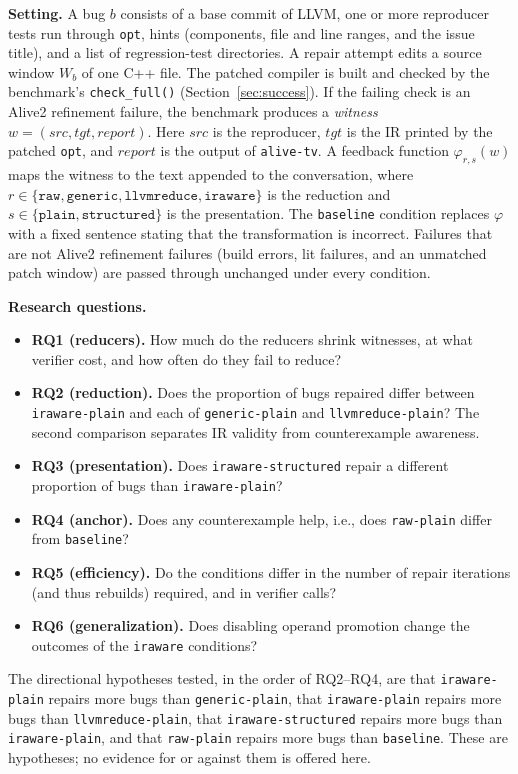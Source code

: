 \documentclass[conference]{IEEEtran}
\newcommand{\cn}[1]{\texttt{#1}}   %
\begin{document}
\textbf{Setting.} A bug $b$ consists of a base commit of LLVM, one or more reproducer tests run through \texttt{opt}, hints (components, file and line ranges, and the issue title), and a list of regression-test directories. A repair attempt edits a source window $W_b$ of one C++ file. The patched compiler is built and checked by the benchmark's \texttt{check\_full()} (Section~\ref{sec:success}). If the failing check is an Alive2 refinement failure, the benchmark produces a \emph{witness} $w=(\mathit{src},\mathit{tgt},\mathit{report})$. Here $\mathit{src}$ is the reproducer, $\mathit{tgt}$ is the IR printed by the patched \texttt{opt}, and $\mathit{report}$ is the output of \texttt{alive-tv}. A feedback function $\varphi_{r,s}(w)$ maps the witness to the text appended to the conversation, where $r\in\{\texttt{raw},\texttt{generic},\texttt{llvmreduce},\texttt{iraware}\}$ is the reduction and $s\in\{\texttt{plain},\texttt{structured}\}$ is the presentation. The \cn{baseline} condition replaces $\varphi$ with a fixed sentence stating that the transformation is incorrect. Failures that are not Alive2 refinement failures (build errors, lit failures, and an unmatched patch window) are passed through unchanged under every condition.

\textbf{Research questions.}
\begin{itemize}
\item \textbf{RQ1 (reducers).} How much do the reducers shrink witnesses, at what verifier cost, and how often do they fail to reduce?
\item \textbf{RQ2 (reduction).} Does the proportion of bugs repaired differ between \cn{iraware-plain} and each of \cn{generic-plain} and \cn{llvmreduce-plain}? The second comparison separates IR validity from counterexample awareness.
\item \textbf{RQ3 (presentation).} Does \cn{iraware-structured} repair a different proportion of bugs than \cn{iraware-plain}?
\item \textbf{RQ4 (anchor).} Does any counterexample help, i.e., does \cn{raw-plain} differ from \cn{baseline}?
\item \textbf{RQ5 (efficiency).} Do the conditions differ in the number of repair iterations (and thus rebuilds) required, and in verifier calls?
\item \textbf{RQ6 (generalization).} Does disabling operand promotion change the outcomes of the \cn{iraware} conditions?
\end{itemize}
The directional hypotheses tested, in the order of RQ2--RQ4, are that \cn{iraware-plain} repairs more bugs than \cn{generic-plain}, that \cn{iraware-plain} repairs more bugs than \cn{llvmreduce-plain}, that \cn{iraware-structured} repairs more bugs than \cn{iraware-plain}, and that \cn{raw-plain} repairs more bugs than \cn{baseline}. These are hypotheses; no evidence for or against them is offered here.
\end{document}
